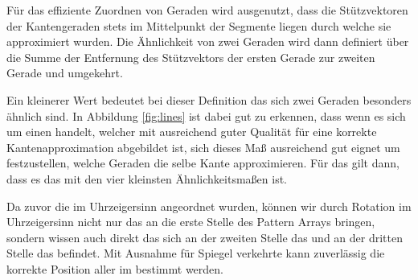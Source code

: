 Für das effiziente Zuordnen von Geraden wird ausgenutzt, dass die Stützvektoren der Kantengeraden stets im Mittelpunkt der Segmente liegen durch welche sie approximiert wurden. Die Ähnlichkeit von zwei Geraden wird dann definiert über die Summe der Entfernung des Stützvektors der ersten Gerade zur zweiten Gerade und umgekehrt.


Ein kleinerer Wert bedeutet bei dieser Definition das sich zwei Geraden besonders ähnlich sind. In Abbildung \ref{fig:lines} ist dabei gut zu erkennen, dass wenn es sich um einen \QRCode handelt, welcher mit ausreichend guter Qualität für eine korrekte Kantenapproximation abgebildet ist, sich dieses Maß ausreichend gut eignet um festzustellen, welche Geraden die selbe Kante approximieren. Für das \olfp gilt dann, dass es das \fp mit den vier kleinsten Ähnlichkeitsmaßen ist.

Da zuvor die \fps im Uhrzeigersinn angeordnet wurden, können wir durch Rotation im Uhrzeigersinn nicht nur das \olfp an die erste Stelle des Pattern Arrays bringen, sondern wissen auch direkt das sich an der zweiten Stelle das \orfp und an der dritten Stelle das \ulfp befindet. Mit Ausnahme für Spiegel verkehrte \QRCodes kann zuverlässig die korrekte Position aller \fps im \QRCode bestimmt werden.


